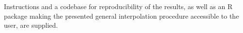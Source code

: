 Instructions and a codebase for reproducibility of the results, as well as an R package making the presented general interpolation procedure accessible to the user, are supplied. 







